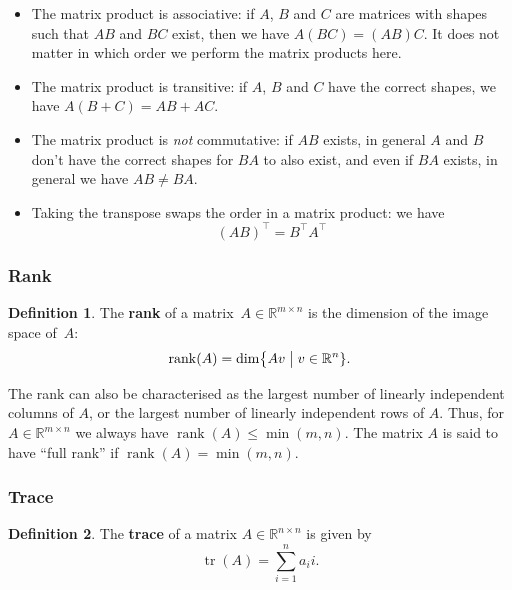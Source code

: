 \documentclass[
  a4paper,
]{article}
\theoremstyle{definition}
\newtheorem{definition}{Definition}[section]
\theoremstyle{definition}
\theoremstyle{definition}
\theoremstyle{definition}
\theoremstyle{remark}
\begin{document}
\begin{itemize}
\item
  The matrix product is associative: if \(A\), \(B\) and \(C\) are matrices
  with shapes such that \(AB\) and \(BC\) exist, then we have \(A(BC) = (AB)C\).
  It does not matter in which order we perform the matrix products here.
\item
  The matrix product is transitive: if \(A\), \(B\) and \(C\) have the
  correct shapes, we have \(A(B+C) = AB + AC\).
\item
  The matrix product is \emph{not} commutative: if \(AB\) exists, in general
  \(A\) and \(B\) don't have the correct shapes for \(BA\) to also exist,
  and even if \(BA\) exists, in general we have \(AB \neq BA\).
\item
  Taking the transpose swaps the order in a matrix product:
  we have
  \begin{equation}
    (AB)^\top = B^\top A^\top  \label{eq:AB-trans}
  \end{equation}
\end{itemize}

\subsubsection{Rank}\label{rank}

\begin{definition}
The \textbf{rank} of a matrix~\(A \in \mathbb{R}^{m \times n}\) is the dimension of the
image space of~\(A\):
\begin{equation*}
  \mathop{\mathrm{rank}}(A)
  = \dim \bigl\{ Av \bigm| v\in \mathbb{R}^n \}.
\end{equation*}
\end{definition}

The rank can also be characterised as the largest number of linearly
independent columns of \(A\), or the largest number of linearly
independent rows of \(A\). Thus, for \(A \in \mathbb{R}^{m \times n}\) we
always have \(\mathop{\mathrm{rank}}(A) \leq \min(m, n)\). The matrix \(A\)
is said to have ``full rank'' if \(\mathop{\mathrm{rank}}(A) = \min(m, n)\).

\subsubsection{Trace}\label{trace}

\begin{definition}
The \textbf{trace} of a matrix \(A \in \mathbb{R}^{n\times n}\) is given by
\begin{equation*}
  \mathop{\mathrm{tr}}(A) = \sum_{i=1}^n a_ii.
\end{equation*}
\end{definition}
\end{document}
